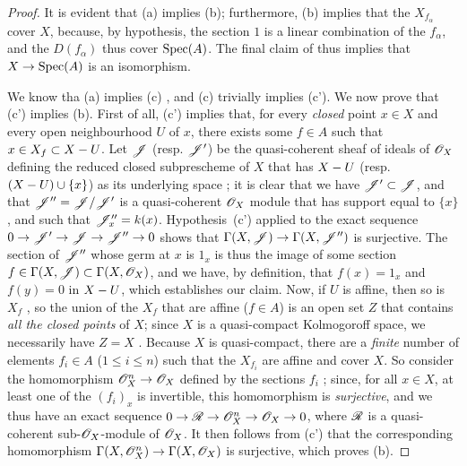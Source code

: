 \begin{proof}
\label{proof-2.5.2.1}
It is evident that (a) implies (b); furthermore, (b) implies that the $X_{f_\alpha}$ cover $X$, because, by hypothesis, the section $1$ is a linear combination of the $f_\alpha$, and the $D(f_\alpha)$ thus cover ${\mathop{\mathrm{Spec}}\nolimits}(A)$.
The final claim of  thus implies that $X\to\Spec(A)$ is an isomorphism.

We know tha (a) implies (c) , and (c) trivially implies (c').
We now prove that (c') implies (b).
First of all, (c') implies that, for every \emph{closed} point $x\in X$ and every open neighbourhood $U$ of $x$, there exists some $f\in A$ such that $x\in X_f\subset X- U$.
Let $\mathscr{J}$ (resp. $\mathscr{J}'$) be the quasi-coherent sheaf of ideals of $\mathscr{O}_X$ defining the reduced closed subprescheme of $X$ that has $X- U$ (resp. $(X- U)\cup\{x\}$) as its underlying space ;
it is clear that we have $\mathscr{J}'\subset\mathscr{J}$, and that $\mathscr{J}''=\mathscr{J}/\mathscr{J}'$ is a quasi-coherent $\mathscr{O}_X$ module that has support equal to $\{x\}$, and such that $\mathscr{J}_x''=k(x)$.
Hypothesis~(c') applied to the exact sequence $0\to\sh{J}'\to\sh{J}\to\sh{J}''\to0$ shows that $\Gamma(X,\sh{J})\to\Gamma(X,\sh{J}'')$ is surjective.
The section of $\mathscr{J}''$ whose germ at $x$ is $1_x$ is thus the image of some section $f\in\Gamma(X,\mathscr{J})\subset\Gamma(X,\mathscr{O}_X)$, and we have, by definition, that $f(x)=1_x$ and $f(y)=0$ in $X- U$, which establishes our claim.
Now, if $U$ is affine, then so is $X_f$ , so the union of the $X_f$ that are affine ($f\in A$) is an open set $Z$ that contains \emph{all the closed points} of $X$;
since $X$ is a quasi-compact Kolmogoroff space, we necessarily have $Z=X$ .
Because $X$ is quasi-compact, there are a \emph{finite} number of elements $f_i\in A$ ($1\leq i\leq n$) such that the $X_{f_i}$ are affine and cover $X$.
So consider the homomorphism $\OO_X^n\to\OO_X$ defined by the sections $f_i$ ;
since, for all $x\in X$, at least one of the $(f_i)_x$ is invertible, this homomorphism is \emph{surjective}, and we thus have an exact sequence $0\to\sh{R}\to\OO_X^n\to\OO_X\to0$, where $\mathscr{R}$ is a quasi-coherent sub-$\mathscr{O}_X$-module of $\mathscr{O}_X$.
It then follows
from (c') that the corresponding homomorphism $\Gamma(X,\OO_X^n)\to\Gamma(X,\OO_X)$ is surjective, which proves (b).


\end{proof}
